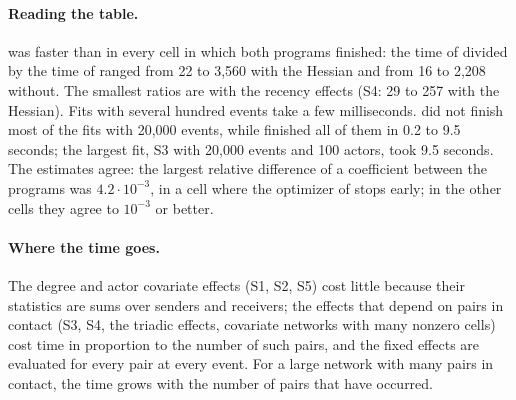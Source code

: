 \paragraph{Reading the table.} \nwrem{} was faster than \relevent{} in every cell in which both programs finished: the time of \relevent{} divided by the time of \nwrem{} ranged from 22 to 3,560 with the Hessian and from 16 to 2,208 without. The smallest ratios are with the recency effects (S4: 29 to 257 with the Hessian). Fits with several hundred events take a few milliseconds. \relevent{} did not finish most of the fits with 20,000 events, while \nwrem{} finished all of them in 0.2 to 9.5 seconds; the largest fit, S3 with 20,000 events and 100 actors, took 9.5 seconds. The estimates agree: the largest relative difference of a coefficient between the programs was $4.2\cdot10^{-3}$, in a cell where the optimizer of \relevent{} stops early; in the other cells they agree to $10^{-3}$ or better.

\paragraph{Where the time goes.} The degree and actor covariate effects (S1, S2, S5) cost little because their statistics are sums over senders and receivers; the effects that depend on pairs in contact (S3, S4, the triadic effects, covariate networks with many nonzero cells) cost time in proportion to the number of such pairs, and the fixed effects are evaluated for every pair at every event. For a large network with many pairs in contact, the time grows with the number of pairs that have occurred.
